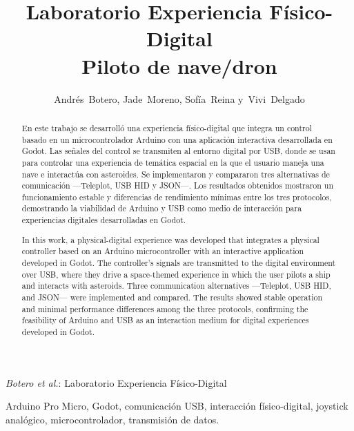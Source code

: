 \documentclass[journal]{IEEEtran}
\begin{document}
\title{Laboratorio Experiencia Físico-Digital
\\
Piloto de nave/dron }
\author{Andrés~Botero, Jade~Moreno, Sofía~Reina y~Vivi~Delgado}%


%
{\textit{Botero et al.}: Laboratorio Experiencia Físico-Digital}

\maketitle

\begin{abstract}
En este trabajo se desarrolló una experiencia físico-digital que integra un control basado en un microcontrolador Arduino con una aplicación interactiva desarrollada en Godot. Las señales del control se transmiten al entorno digital por USB, donde se usan para controlar una experiencia de temática espacial en la que el usuario maneja una nave e interactúa con asteroides. Se implementaron y compararon tres alternativas de comunicación ---Teleplot, USB HID y JSON---. Los resultados obtenidos mostraron un funcionamiento estable y diferencias de rendimiento mínimas entre los tres protocolos, demostrando la viabilidad de Arduino y USB como medio de interacción para experiencias digitales desarrolladas en Godot.
\end{abstract}

\renewcommand{\abstractname}{Abstract}
\begin{abstract}
In this work, a physical-digital experience was developed that integrates a physical controller based on an Arduino microcontroller with an interactive application developed in Godot. The controller's signals are transmitted to the digital environment over USB, where they drive a space-themed experience in which the user pilots a ship and interacts with asteroids. Three communication alternatives ---Teleplot, USB HID, and JSON--- were implemented and compared. The results showed stable operation and minimal performance differences among the three protocols, confirming the feasibility of Arduino and USB as an interaction medium for digital experiences developed in Godot.
\end{abstract}

\begin{IEEEkeywords}
Arduino Pro Micro, Godot, comunicación USB, interacción físico-digital, joystick analógico, microcontrolador, transmisión de datos.
\end{IEEEkeywords}
\end{document}
